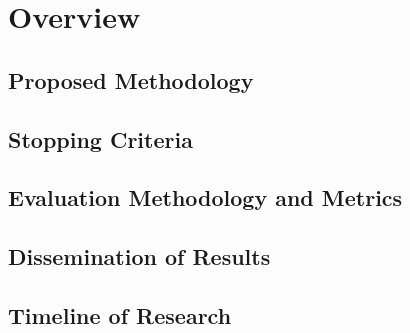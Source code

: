 \chapter{Overview}


\section{Proposed Methodology}

\section{Stopping Criteria}

\section{Evaluation Methodology and Metrics}

\section{Dissemination of Results}

\section{Timeline of Research}

